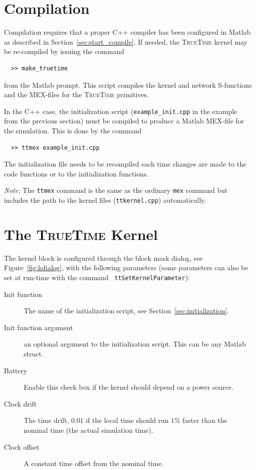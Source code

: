\documentclass[final,twoside]{rapport}
\begin{document}
\section{Compilation}
\label{sec:compile}

Compilation requires that a proper C++ compiler has been configured in
Matlab as described in Section~\ref{sec:start_compile}. If needed, the
\textsc{TrueTime} kernel may be re-compiled by issuing the command

\begin{small}
\begin{verbatim}
  >> make_truetime
\end{verbatim}
\end{small}

from the Matlab prompt. This script compiles the kernel and network
S-functions and the MEX-files for the \textsc{TrueTime} primitives.

In the C++ case, the initialization script (\texttt{example\_init.cpp}
in the example from the previous section) must be compiled to produce
a Matlab MEX-file for the simulation. This is done by the command

\begin{small}
\begin{verbatim}
  >> ttmex example_init.cpp
\end{verbatim}
\end{small}

The initialization file needs to be recompiled each time changes are made to
the code functions or to the initialization functions.

{\em Note:} The \texttt{ttmex} command is the same as the ordinary
\texttt{mex} command but includes the path to the kernel files
(\texttt{ttkernel.cpp}) automatically.


\section{The \textsc{TrueTime} Kernel}
\label{sec:kernel}

The kernel block is configured through the block mask dialog, see
Figure~\ref{fig:kdialog}, with the following parameters (some
parameters can also be set at run-time with the command {\tt
  ttSetKernelParameter}):

\begin{description}
\item[Init function] The name of the initialization script,
  see Section~\ref{sec:initialization}.
\item[Init function argument] an optional argument to the
  initialization script. This can be any Matlab struct.
\item[Battery] Enable this check box if the kernel should depend on a power source.
\item[Clock drift] The time drift, $0.01$ if the local time should run
  $1\%$ faster than the nominal time (the actual simulation time).
\item[Clock offset] A constant time offset from the nominal time.
\end{description}
\end{document}
